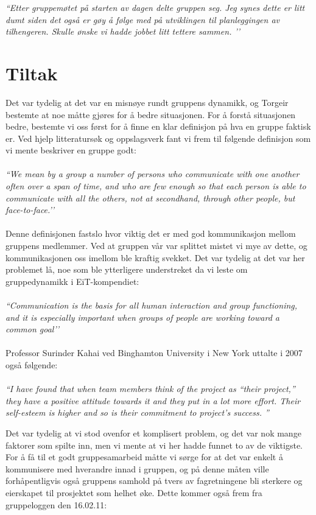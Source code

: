 \emph{``Etter gruppemøtet på starten av dagen delte gruppen seg. Jeg synes dette er litt dumt siden det også er gøy å følge med på utviklingen til planleggingen av tilhengeren. Skulle ønske vi hadde jobbet litt tettere sammen. ’’}

\section{Tiltak}
Det var tydelig at det var en misnøye rundt gruppens dynamikk, og Torgeir bestemte at noe måtte gjøres for å bedre situasjonen. For å forstå situasjonen bedre, bestemte vi oss først for å finne en klar definisjon på hva en gruppe faktisk er. Ved hjelp litteratursøk og oppslagsverk fant vi frem til følgende definisjon som vi mente beskriver en gruppe godt:\\\\
\emph{``We mean by a group a number of persons who communicate with one another often over a span of time, and who are few enough so that each person is able to communicate with all the others, not at secondhand, through other people, but face-to-face.’’} \cite{groundrules}\\\\
Denne definisjonen fastslo hvor viktig det er med god kommunikasjon mellom gruppens medlemmer. Ved at gruppen vår var splittet mistet vi mye av dette, og kommunikasjonen oss imellom ble kraftig svekket. Det var tydelig at det var her problemet lå, noe som ble ytterligere understreket da vi leste om gruppedynamikk i EiT-kompendiet:\\\\
\emph{``Communication is the basis for all human interaction and group functioning, and it is especially important when groups of people are working toward a common goal’’} \cite{groundrules}\\\\
Professor Surinder Kahai ved Binghamton University i New York uttalte i 2007 også følgende:\\\\
\emph{``I have found that when team members think of the project as “their project,” they have a positive attitude towards it and they put in a lot more effort. Their self-esteem is higher and so is their commitment to project’s success. ''} \cite{leading}\newline

Det var tydelig at vi stod ovenfor et komplisert problem, og det var nok mange faktorer som spilte inn, men vi mente at vi her hadde funnet to av de viktigste. For å få til et godt gruppesamarbeid måtte vi sørge for at det var enkelt å kommunisere med hverandre innad i gruppen, og på denne måten ville forhåpentligvis også gruppens samhold på tvers av fagretningene bli sterkere og eierskapet til prosjektet som helhet øke. Dette kommer også frem fra gruppeloggen den 16.02.11:\newline

